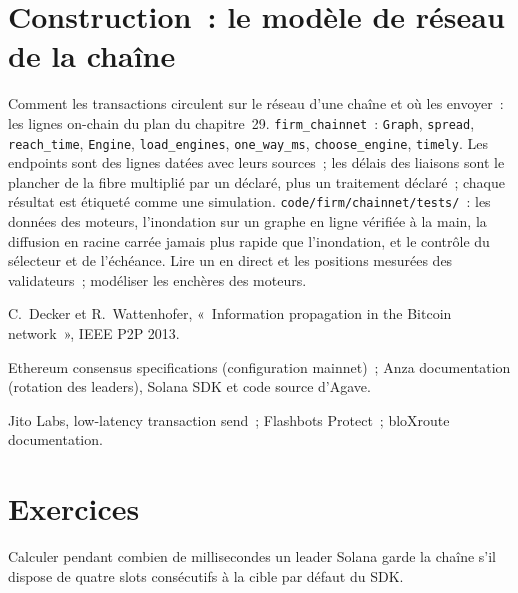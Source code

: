 \section{Construction~: le modèle de réseau de la chaîne}\label{bld:nw:on-chain-connectivity:chainnet}

\begin{build}
 Comment les transactions circulent sur le réseau d'une chaîne et où les envoyer~: les lignes on-chain du plan du chapitre~29.
 \texttt{firm\_chainnet}~: \texttt{Graph}, \texttt{spread}, \texttt{reach\_time}, \texttt{Engine}, \texttt{load\_engines},
\texttt{one\_way\_ms}, \texttt{choose\_engine}, \texttt{timely}.
 Les endpoints sont des lignes datées avec leurs sources~; les délais des liaisons sont le plancher de la fibre multiplié par un  déclaré, plus un traitement déclaré~; chaque résultat
est étiqueté comme une simulation.
 \texttt{code/firm/chainnet/tests/}~: les données des moteurs, l'inondation sur un graphe en ligne vérifiée à la main, la diffusion en racine carrée jamais plus rapide
que l'inondation, et le contrôle du sélecteur et de l'échéance.
 Lire un  en direct et les positions mesurées des validateurs~; modéliser les enchères des moteurs.
\end{build}

\begin{omsources}
\item C.~Decker et R.~Wattenhofer, «~Information propagation in the Bitcoin network~», IEEE P2P 2013.
\item Ethereum consensus specifications (configuration mainnet)~; Anza documentation (rotation des leaders), Solana SDK et code source d'Agave.
\item Jito Labs, low-latency transaction send~; Flashbots Protect~; bloXroute documentation.
\end{omsources}

\section{Exercices}

\begin{exercise}[$\star$]\label{exo:nw:on-chain-connectivity:1}
Calculer pendant combien de millisecondes un leader Solana garde la chaîne s'il dispose de quatre slots consécutifs à la cible par défaut du SDK.
\end{exercise}

